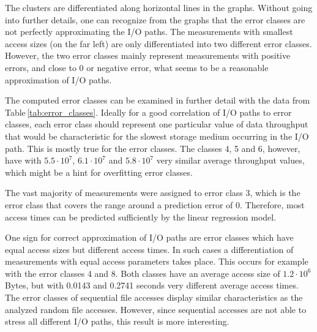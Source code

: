 \documentclass{superfri}
\begin{document}
	
	The clusters are differentiated along horizontal lines in the graphs.
	Without going into further details, one can recognize from the graphs that the error classes are not perfectly approximating the I/O paths.
	The measurements with smallest access sizes (on the far left) are only differentiated into two different error classes.
	However, the two error classes mainly represent measurements with positive errors, and close to 0 or negative error, what seems to be a reasonable approximation of I/O paths.\medskip
	
	The computed error classes can be examined in further detail with the data from Table\,\ref{tab:error_classes}.
	Ideally for a good correlation of I/O paths to error classes, each error class should represent one particular value of data throughput that would be characteristic for the slowest storage medium occurring in the I/O path. 
	This is mostly true for the error classes. The classes 4, 5 and 6, however, have with $5.5\cdot10^7$, $6.1\cdot10^7$ and $5.8\cdot10^7$ very similar average throughput values, which might be a hint for overfitting error classes.
	
	
	The vast majority of measurements were assigned to error class 3, which is the error class that covers the range around a prediction error of 0.
	Therefore, most access times can be predicted sufficiently by the linear regression model.
	
	One sign for correct approximation of I/O paths are error classes which have equal access sizes but different access times.
	In such cases a differentiation of measurements with equal access parameters takes place.
	This occurs for example with the error classes 4 and 8. Both classes have an average access size of $1.2\cdot10^6$ Bytes, but with 0.0143 and 0.2741 seconds very different average access times.
	The error classes of sequential file accesses display similar characteristics as the analyzed random file accesses.
	However, since sequential accesses are not able to stress all different I/O paths, this result is more interesting.
	
\end{document}
